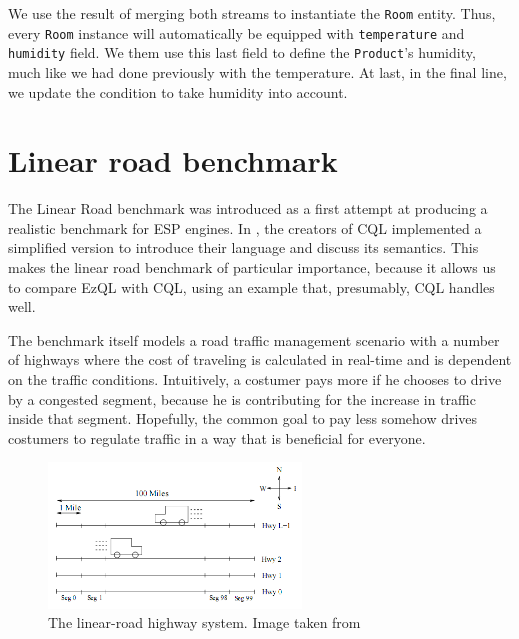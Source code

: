We use the result of merging both streams to instantiate the
\verb=Room= entity. Thus, every \verb=Room= instance will
automatically be equipped with \verb=temperature= and \verb=humidity=
field. We them use this last field to define the \verb=Product='s
humidity, much like we had done previously with the temperature. At
last, in the final line, we update the condition to take humidity into
account.

\section{Linear road benchmark}

The Linear Road benchmark \cite{lrb} was introduced as a first attempt
at producing a realistic benchmark for ESP engines. In \cite{cql}, the
creators of CQL implemented a simplified version to introduce their
language and discuss its semantics. This makes the linear road
benchmark of particular importance, because it allows us to compare
EzQL with CQL, using an example that, presumably, CQL handles well.

The benchmark itself models a road traffic management scenario with a
number of highways where the cost of traveling is calculated in
real-time and is dependent on the traffic conditions. Intuitively, a
costumer pays more if he chooses to drive by a congested segment,
because he is contributing for the increase in traffic inside that
segment. Hopefully, the common goal to pay less somehow drives
costumers to regulate traffic in a way that is beneficial for
everyone.

\begin{figure}[t]
  \centering
  \includegraphics[width=0.6\textwidth]{lrb.png}
\caption{The linear-road highway system. Image taken from \cite{cql}}
\end{figure}


